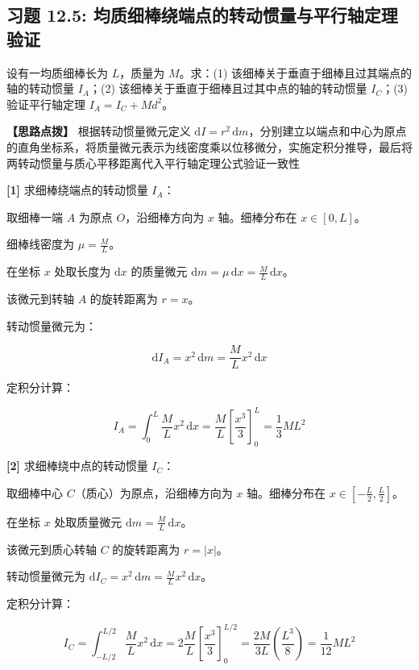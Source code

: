 \documentclass[11pt,a4paper,UTF8]{ctexart}
\begin{document}
\subsection{习题 12.5: 均质细棒绕端点的转动惯量与平行轴定理验证}

设有一均质细棒长为 $L$，质量为 $M$。求：(1) 该细棒关于垂直于细棒且过其端点的轴的转动惯量 $I_A$；(2) 该细棒关于垂直于细棒且过其中点的轴的转动惯量 $I_C$；(3) 验证平行轴定理 $I_A = I_C + M d^2$。

\textbf{\color{DeepPurple}【思路点拨】} 根据转动惯量微元定义 $\mathrm{d}I = r^2\,\mathrm{d}m$，分别建立以端点和中心为原点的直角坐标系，将质量微元表示为线密度乘以位移微分，实施定积分推导，最后将两转动惯量与质心平移距离代入平行轴定理公式验证一致性


\begin{solbox}[分步推导与答题规范]
\textbf{[1]} 求细棒绕端点的转动惯量 $I_A$：

取细棒一端 $A$ 为原点 $O$，沿细棒方向为 $x$ 轴。细棒分布在 $x \in [0, L]$。

细棒线密度为 $\mu = \frac{M}{L}$。

在坐标 $x$ 处取长度为 $\mathrm{d}x$ 的质量微元 $\mathrm{d}m = \mu\,\mathrm{d}x = \frac{M}{L}\,\mathrm{d}x$。

该微元到转轴 $A$ 的旋转距离为 $r = x$。

转动惯量微元为：


\begin{equation*}
\mathrm{d}I_A = x^2\,\mathrm{d}m = \frac{M}{L} x^2\,\mathrm{d}x
\end{equation*}


定积分计算：


\begin{equation*}
I_A = \int_0^L \frac{M}{L} x^2\,\mathrm{d}x = \frac{M}{L} \left[\frac{x^3}{3}\right]_0^L = \frac{1}{3}M L^2
\end{equation*}


\textbf{[2]} 求细棒绕中点的转动惯量 $I_C$：

取细棒中心 $C$（质心）为原点，沿细棒方向为 $x$ 轴。细棒分布在 $x \in [-\frac{L}{2}, \frac{L}{2}]$。

在坐标 $x$ 处取质量微元 $\mathrm{d}m = \frac{M}{L}\,\mathrm{d}x$。

该微元到质心转轴 $C$ 的旋转距离为 $r = |x|$。

转动惯量微元为 $\mathrm{d}I_C = x^2\,\mathrm{d}m = \frac{M}{L} x^2\,\mathrm{d}x$。

定积分计算：


\begin{equation*}
I_C = \int_{-L/2}^{L/2} \frac{M}{L} x^2\,\mathrm{d}x = 2 \frac{M}{L} \left[\frac{x^3}{3}\right]_0^{L/2} = \frac{2M}{3L} \left(\frac{L^3}{8}\right) = \frac{1}{12}M L^2
\end{equation*}



\end{solbox}
\end{document}
